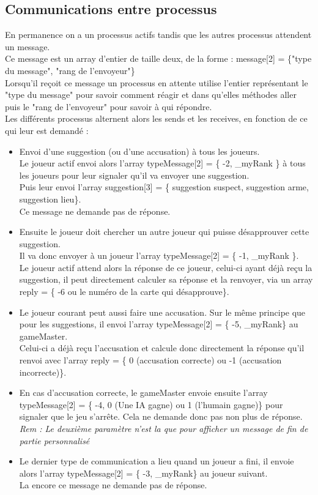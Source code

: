 \documentclass[a4paper,10pt]{article}
\begin{document}
	
	
	\subsection{Communications entre processus}
		En permanence on a un processus actifs tandis que les autres processus attendent un message.\\
		Ce message est un array d'entier de taille deux, de la forme : message[2] = \{"type du message", "rang de l'envoyeur"\}\\
		Lorsqu'il reçoit ce message un processus en attente utilise l'entier représentant le "type du message" pour savoir comment réagir et dans qu'elles méthodes aller puis le "rang de l'envoyeur" pour savoir à qui répondre.\\
		Les différents processus alternent alors les sends et les receives, en fonction de ce qui leur est demandé :
		\begin{itemize}
			\item Envoi d'une suggestion (ou d'une accusation) à tous les joueurs.\\
					Le joueur actif envoi alors l'array typeMessage[2] = \{ -2, \_myRank \} à tous les joueurs pour leur signaler qu'il va envoyer une suggestion.\\
					Puis leur envoi l'array suggestion[3] = \{ suggestion suspect, suggestion arme, suggestion lieu\}.\\
					Ce message ne demande pas de réponse.
			\item Ensuite le joueur doit chercher un autre joueur qui puisse désapprouver cette suggestion.\\
					Il va donc envoyer à un joueur l'array typeMessage[2] = \{ -1, \_myRank \}.\\
					Le joueur actif attend alors la réponse de ce joueur, celui-ci ayant déjà reçu la suggestion, il peut directement calculer sa réponse et la renvoyer, via un array reply = \{ -6 ou le numéro de la carte qui désapprouve\}.
			\item Le joueur courant peut aussi faire une accusation. Sur le même principe que pour les suggestions, il envoi l'array typeMessage[2] = \{ -5, \_myRank\} au gameMaster.\\
				Celui-ci a déjà reçu l'accusation et calcule donc directement la réponse qu'il renvoi avec l'array reply = \{ 0 (accusation correcte) ou -1 (accusation incorrecte)\}.
			\item En cas d'accusation correcte, le gameMaster envoie ensuite l'array typeMessage[2] = \{ -4, 0 (Une IA gagne) ou 1 (l'humain gagne)\} pour signaler que le jeu s’arrête. Cela ne demande donc pas non plus de réponse.\\
			\textit{Rem : Le deuxième paramètre n'est la que pour afficher un message de fin de partie personnalisé}
			\item Le dernier type de communication a lieu quand un joueur a fini, il envoie alors l'array typeMessage[2] = \{ -3, \_myRank\} au joueur suivant.\\
			La encore ce message ne demande pas de réponse.		
		\end{itemize}
\end{document}
